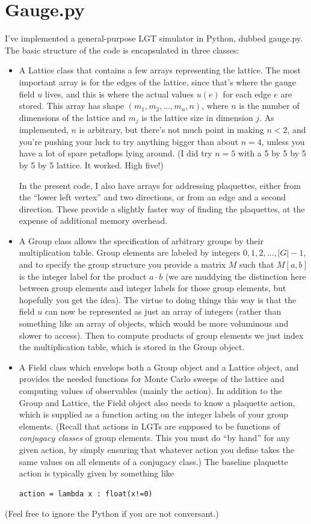 \documentclass[9pt,twocolumn,twoside]{article}
\begin{document}
\section{Gauge.py}
I've implemented a general-purpose LGT simulator in Python, dubbed gauge.py.  The basic structure of the code is encapsulated in three classes: 
\begin{itemize}
\item A Lattice class that contains a few arrays representing the lattice.  The most important array is for the edges of the lattice, since that's where the gauge field $u$ lives, and this is where the actual values $u(e)$ for each edge $e$ are stored.  This array has shape $(m_1,m_2,...,m_n,n)$, where $n$ is the number of dimensions of the lattice and $m_j$ is the lattice size in dimension $j$.  As implemented, $n$ is arbitrary, but there's not much point in making $n<2$, and you're pushing your luck to try anything bigger than about $n=4$, unless you have a lot of spare petaflops lying around.  (I did try $n=5$ with a 5 by 5 by 5 by 5 by 5 lattice.  It worked.  High five!) 

In the present code, I also have arrays for addressing plaquettes, either from the ``lower left vertex'' and two directions, or from an edge and a second direction.  These provide a slightly faster way of finding the plaquettes, at the expense of additional memory overhead. 
\item A Group class allows the specification of arbitrary groups by their multiplication table.  Group elements are labeled by integers $0,1,2,...,|G|-1$, and to specify the group structure you provide a matrix $M$ such that $M[a,b]$ is the integer label for the product $a\cdot b$ (we are muddying the distinction here between group elements and integer labels for those group elements, but hopefully you get the idea).  The virtue to doing things this way is that the field $u$ can now be represented as just an array of integers (rather than something like an array of objects, which would be more voluminous and slower to access).  Then to compute products of group elements we just index the multiplication table, which is stored in the Group object. 
\item A Field class which envelops both a Group object and a Lattice object, and provides the needed functions for Monte Carlo sweeps of the lattice and computing values of observables (mainly the action).  In addition to the Group and Lattice, the Field object also needs to know a plaquette action, which is supplied as a function acting on the integer labels of your group elements.  (Recall that actions in LGTs are supposed to be functions of \textit{conjugacy classes} of group elements.  This you must do ``by hand'' for any given action, by simply ensuring that whatever action you define takes the same values on all elements of a conjugacy class.)  The baseline plaquette action is typically given by something like 
\begin{lstlisting}
action = lambda x : float(x!=0)
\end{lstlisting}
\end{itemize}
(Feel free to ignore the Python if you are not conversant.)
\end{document}
